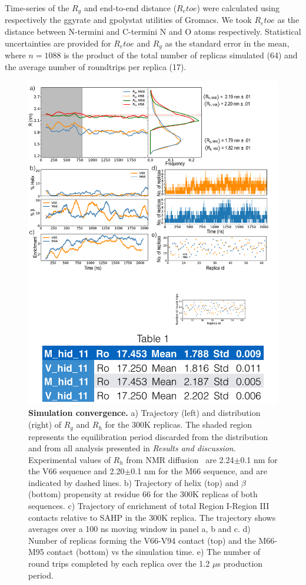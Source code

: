 \documentclass[10pt,letterpaper]{article}
\begin{document}
Time-series of the $R_g$ and end-to-end distance ($R_etoe$) were calculated using respectively the g\textunderscore gyrate and g\textunderscore polystat utilities of Gromacs. We took $R_etoe$ as the distance between N-termini and C-termini N and O atoms respectively. Statistical uncertainties are provided for $R_etoe$ and $R_g$ as the standard error in the mean, where $n = 1088$ is the product of the total number of replicas simulated (64) and the average number of roundtrips per replica (17). 

\begin{figure}[!ht]
\includegraphics[scale=0.5,width=\textwidth,trim={0 0cm 0 0cm},clip]{./figures/fig8.pdf}
\caption{{\bf Simulation convergence.} a) Trajectory (left) and distribution (right) of $R_{g}$ and $R_{h}$ for the 300K replicas. The shaded region represents the equilibration period discarded from the distribution and from all analysis presented in {\it Results and discussion}. Experimental values of $R_{h}$ from NMR diffusion~\cite{Anastasia2013} are 2.24$\pm${0.1} nm for the V66 sequence and 2.20$\pm${0.1} nm for the M66 sequence, and are indicated by dashed lines. b) Trajectory of helix (top) and $\beta$ (bottom) propensity at residue 66 for the 300K replicas of both sequences. c) Trajectory of enrichment of total Region I-Region III contacts relative to SAHP in the 300K replica. The trajectory shows averages over a 100 ns moving window in panel a, b and c.  d) Number of replicas forming the V66-V94 contact (top) and the M66-M95 contact (bottom) vs the simulation time. e) The number of round trips completed by each replica over the 1.2 $\mu$s production period.}
\label{fig8} 
\end{figure}
\end{document}
